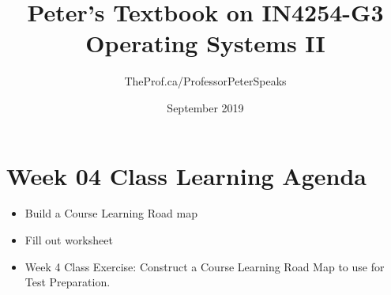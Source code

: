 \documentclass{article}
\title{Peter's Textbook on IN4254-G3 Operating Systems II}
\author{TheProf.ca/ProfessorPeterSpeaks }
\date{September 2019}
\begin{document}
\maketitle

\tableofcontents



\section * {Week 04 Class Learning Agenda}
\begin{itemize}
    \item Build a Course Learning Road map
    \item Fill out worksheet
    \item Week 4 Class Exercise: Construct a Course Learning Road Map to use for Test Preparation.
\end{itemize}










 
\end{document}

